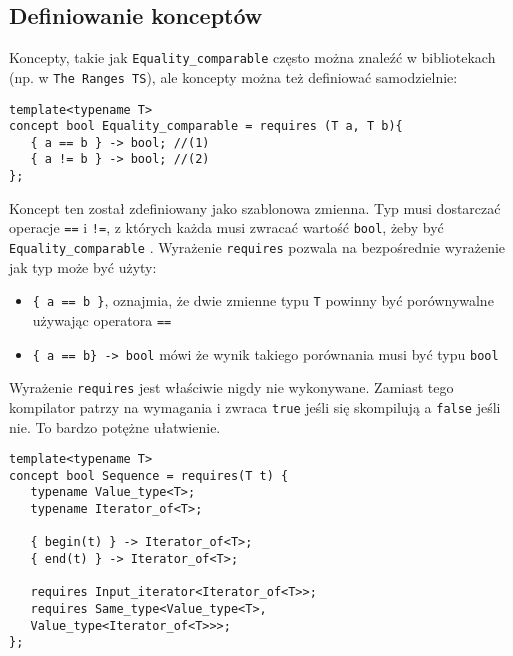 \documentclass[11pt, a4paper]{article}
\begin{document}
\lstset{language=C++}

\subsection{Definiowanie konceptów}

Koncepty, takie jak \verb#Equality_comparable# często można znaleźć w bibliotekach (np. w \verb#The Ranges TS#), ale koncepty można też definiować samodzielnie: \newline

\begin{lstlisting}[frame=single]
template<typename T>
concept bool Equality_comparable = requires (T a, T b){
   { a == b } -> bool; //(1)
   { a != b } -> bool; //(2)
};

\end{lstlisting}

Koncept ten został zdefiniowany jako szablonowa zmienna. Typ musi dostarczać operacje \verb#==# i \verb#!=#, z których każda musi zwracać wartość \verb#bool#, żeby być \verb#Equality_comparable#
. Wyrażenie \verb#requires# pozwala na bezpośrednie wyrażenie jak typ może być użyty:

\begin{itemize}

\item \verb#{ a == b }#, oznajmia, że dwie zmienne typu \verb#T# powinny być porównywalne używając operatora \verb#==#

\item \verb#{ a == b} -> bool# mówi że wynik takiego porównania musi być typu \verb#bool#

\end{itemize}

Wyrażenie \verb#requires# jest właściwie nigdy nie wykonywane. Zamiast tego kompilator patrzy na wymagania  i zwraca \verb#true# jeśli się skompilują a \verb#false# jeśli nie. To bardzo potężne ułatwienie. 

\begin{lstlisting}[frame=single]
template<typename T>
concept bool Sequence = requires(T t) {
   typename Value_type<T>;
   typename Iterator_of<T>;
   
   { begin(t) } -> Iterator_of<T>;
   { end(t) } -> Iterator_of<T>;
   
   requires Input_iterator<Iterator_of<T>>;
   requires Same_type<Value_type<T>,
   Value_type<Iterator_of<T>>>;
};

\end{lstlisting}
\end{document}
